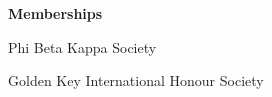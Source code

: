 \begin{singlespace}

\centerline{\textbf{ Memberships}}
\vspace{8pt}
\centerline{Phi Beta Kappa Society}
\centerline{Golden Key International Honour Society}
\end{singlespace}



%

